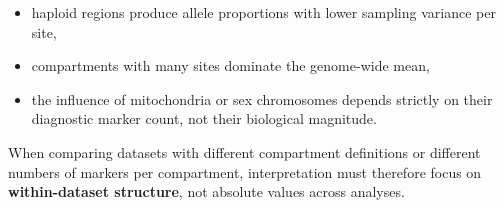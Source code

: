 \documentclass[
]{book}
\providecommand{\tightlist}{%
  \setlength{\itemsep}{0pt}\setlength{\parskip}{0pt}}
\begin{document}
\begin{itemize}
\tightlist
\item
  haploid regions produce allele proportions with lower sampling variance per site,
\item
  compartments with many sites dominate the genome-wide mean,
\item
  the influence of mitochondria or sex chromosomes depends strictly on their diagnostic marker count, not their biological magnitude.
\end{itemize}

When comparing datasets with different compartment definitions or different numbers of markers per compartment, interpretation must therefore focus on \textbf{within-dataset structure}, not absolute values across analyses.

  
\end{document}

